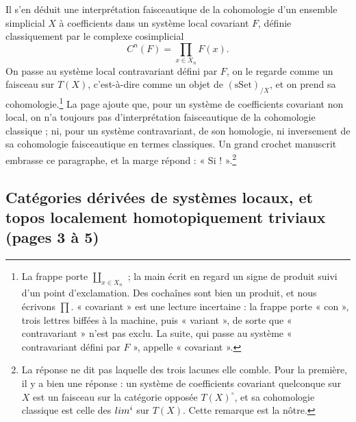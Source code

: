\documentclass[11pt,a4paper]{article}
\begin{document}
Il s'en déduit une interprétation faisceautique de la cohomologie d'un ensemble
simplicial $X$ à coefficients dans un système local covariant $F$, définie
classiquement par le complexe cosimplicial
\[
C^{n}(F) = \prod_{x \in X_n} F(x).
\]
On passe au système local contravariant défini par $F$, on le regarde comme un
faisceau sur $T(X)$, c'est-à-dire comme un objet de $(\mathrm{sSet})_{/X}$, et
on prend sa cohomologie.\footnote{La frappe porte $\coprod_{x \in X_n}$ ; la
main écrit en regard un signe de produit suivi d'un point d'exclamation. Des
cochaînes sont bien un produit, et nous écrivons $\prod$. « covariant » est une
lecture incertaine : la frappe porte « con », trois lettres biffées à la
machine, puis « variant », de sorte que « contravariant » n'est pas exclu. La
suite, qui passe au système « contravariant défini par $F$ », appelle
« covariant ».} La page ajoute que, pour un système de coefficients covariant
non local, on n'a toujours pas d'interprétation faisceautique de la cohomologie
classique ; ni, pour un système contravariant, de son homologie, ni
inversement de sa cohomologie faisceautique en termes classiques. Un grand
crochet manuscrit embrasse ce paragraphe, et la marge répond :
« Si ! ».\footnote{La réponse ne dit pas laquelle des trois lacunes elle
comble. Pour la première, il y a bien une réponse : un système de coefficients
covariant quelconque sur $X$ est un faisceau sur la catégorie opposée
$T(X)^{\circ}$, et sa cohomologie classique est celle des $\varprojlim^{i}$
sur $T(X)$. Cette remarque est la nôtre.}

\subsection*{Catégories dérivées de systèmes locaux, et topos localement homotopiquement triviaux (pages 3 à 5)}
\end{document}
